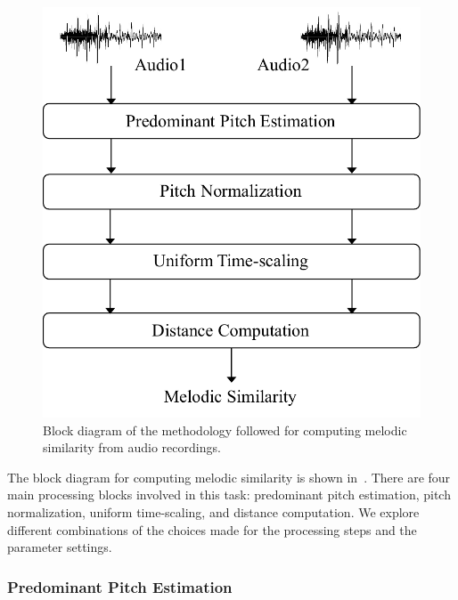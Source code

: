 \begin{figure}
	\begin{center}
		\includegraphics[width=\figSizeSixty]{ch06_patterns/figures/SimilarityEvaluation/melodic_similarity_blockd.pdf}
	\end{center}
	\caption[Block diagram for computing melodic similarity]{Block diagram of the methodology followed for computing melodic similarity from audio recordings.}
	\label{fig:block_diagram_melodic_similarity}
\end{figure}

The block diagram for computing melodic similarity is shown in~. There are four main processing blocks involved in this task: predominant pitch estimation, pitch normalization, uniform time-scaling, and distance computation. We explore different combinations of the choices made for the processing steps and the parameter settings.

\subsubsection{Predominant Pitch Estimation}
\label{sec:patterns_melodic_similarity_representation}

